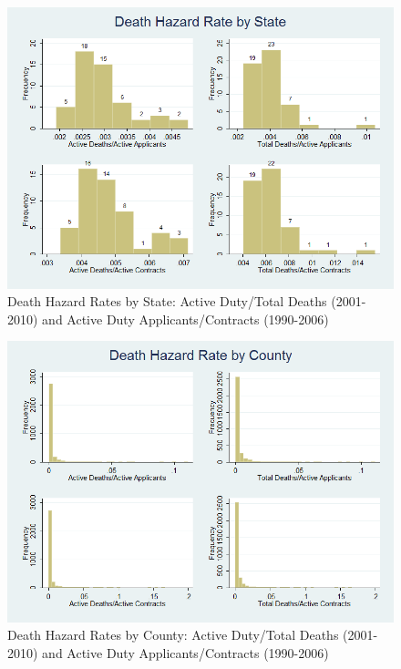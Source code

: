\documentclass[12pt] {article}
\begin{document}
\begin{figure}
\includegraphics[scale=0.6]{../Output/hist_state_combined.png}
\caption{Death Hazard Rates by State: Active Duty/Total Deaths (2001-2010) and Active Duty Applicants/Contracts (1990-2006)}
\label{Flo:HISTOstatedeaths}
\end{figure}

\begin{figure}
\includegraphics[scale=0.6]{../Output/hist_county_combined.png}
\caption{Death Hazard Rates by County: Active Duty/Total Deaths (2001-2010) and Active Duty Applicants/Contracts (1990-2006)}
\label{Flo:HISTOcountydeaths}
\end{figure}
\end{document}

